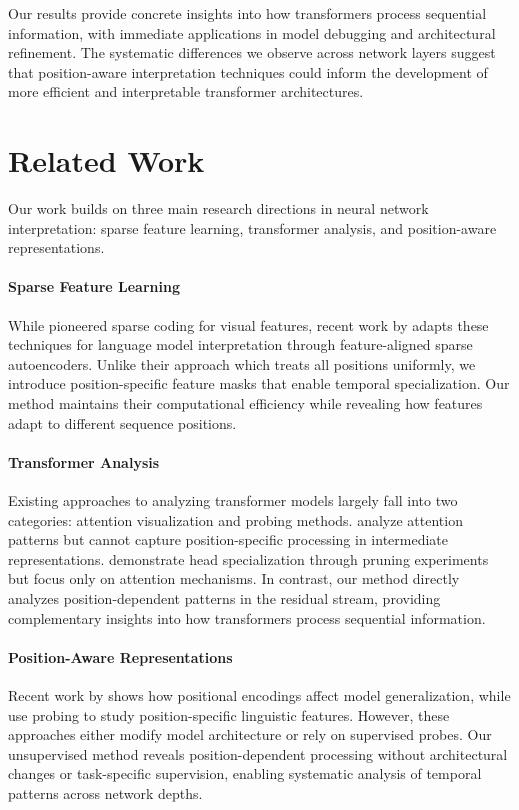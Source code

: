 \documentclass{article} %
\begin{document}
Our results provide concrete insights into how transformers process sequential information, with immediate applications in model debugging and architectural refinement. The systematic differences we observe across network layers suggest that position-aware interpretation techniques could inform the development of more efficient and interpretable transformer architectures.

\section{Related Work}
\label{sec:related}
Our work builds on three main research directions in neural network interpretation: sparse feature learning, transformer analysis, and position-aware representations.

\paragraph{Sparse Feature Learning} While \citet{Olshausen1996EmergenceOS} pioneered sparse coding for visual features, recent work by \citet{Marks2024EnhancingNN} adapts these techniques for language model interpretation through feature-aligned sparse autoencoders. Unlike their approach which treats all positions uniformly, we introduce position-specific feature masks that enable temporal specialization. Our method maintains their computational efficiency while revealing how features adapt to different sequence positions.

\paragraph{Transformer Analysis} Existing approaches to analyzing transformer models largely fall into two categories: attention visualization and probing methods. \citet{Clark2019WhatDB} analyze attention patterns but cannot capture position-specific processing in intermediate representations. \citet{Voita2019AnalyzingMS} demonstrate head specialization through pruning experiments but focus only on attention mechanisms. In contrast, our method directly analyzes position-dependent patterns in the residual stream, providing complementary insights into how transformers process sequential information.

\paragraph{Position-Aware Representations} Recent work by \citet{Kazemnejad2023TheIO} shows how positional encodings affect model generalization, while \citet{He2024DecodingPR} use probing to study position-specific linguistic features. However, these approaches either modify model architecture or rely on supervised probes. Our unsupervised method reveals position-dependent processing without architectural changes or task-specific supervision, enabling systematic analysis of temporal patterns across network depths.
\end{document}
